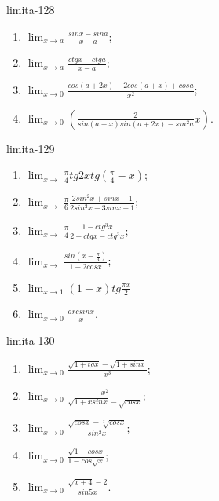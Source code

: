 \begin{defproblem}{limita-128}
\begin{multicols}{2}
\begin{enumerate}
    \item $\lim_{{x \rightarrow a}} \frac{sin x - sin a}{x-a}$;
    \item $\lim_{{x \rightarrow a}} \frac{ctg x - ctg a}{x-a}$;
    \item $\lim_{{x \rightarrow 0}}  \frac{cos (a+2x)-2 cos (a+x)+cos a}{x^2}$;
    \item $\lim_{{x \rightarrow 0}} (\frac{2}{sin (a+x) sin (a+2x)-sin ^2 a}{x})$.
\end{enumerate}
\end{multicols}
\end{defproblem}

\begin{defproblem}{limita-129}
\begin{multicols}{2}
\begin{enumerate}
    \item $\lim_{{x \rightarrow}} \frac{\pi}{4} tg 2x tg(\frac{\pi}{4}-x)$;
    \item $\lim_{{x \rightarrow}} \frac{\pi}{6} \frac{2 sin^2 x +sin x -1}{2 sin^2 x - 3 sin x + 1}$;
    \item $\lim_{{x \rightarrow}} \frac{\pi}{4}  \frac{1-ctg^3 x}{2- ctg x - ctg^3 x}$;
    \item $\lim_{{x \rightarrow}} \frac{sin(x-\frac{\pi}{3})}{1-2cos x}$;
    \item $\lim_{{x \rightarrow 1}} (1-x) tg \frac{\pi x}{2}$
    \item $\lim_{x \rightarrow 0} \frac{arcsin x}{x}$.
\end{enumerate}
\end{multicols}
\end{defproblem}

\begin{defproblem}{limita-130}
\begin{multicols}{2}
\begin{enumerate}
    \item $\lim_{{x \rightarrow 0}} \frac{\sqrt{1+tg x}-\sqrt{1+sin x}}{x^3}$;
    \item $\lim_{{x \rightarrow 0}} \frac{x^2}{\sqrt{1+x sin x}-\sqrt{cos x}}$;
    \item $\lim_{{x \rightarrow 0}} \frac{\sqrt{cos x}-\sqrt[3]{cos x}}{sin^2 x}$;
    \item $\lim_{{x \rightarrow 0}} \frac{\sqrt{1-cos x}}{1-cos \sqrt{x}}$;
    \item $\lim_{{x \rightarrow 0}} \frac{\sqrt{x+4}-2}{sin 5x}$.
\end{enumerate}
\end{multicols}
\end{defproblem}

